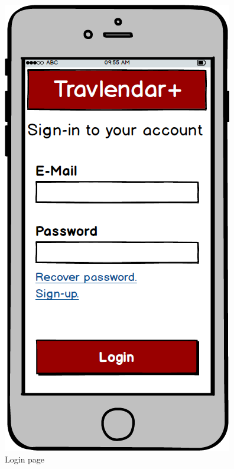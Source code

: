 \begin{figure}[!htb]

\begin{minipage}[b]{0.4\textwidth}
	\centering
	\includegraphics[scale=0.3]{images/login}
	\caption{Login page}
	\label{ref:login}
\end{minipage}
\hfill
\begin{minipage}[b]{0.4\textwidth}
	\centering

\end{minipage}
\end{figure}
